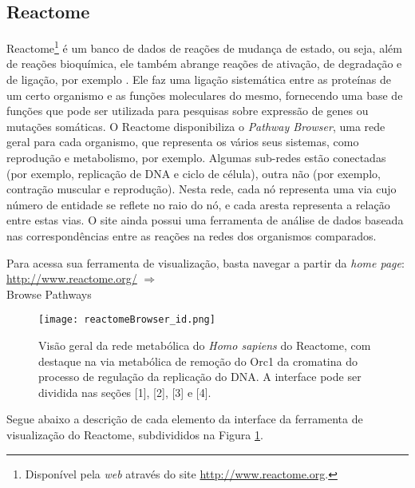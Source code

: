 
\subsection{Reactome}

\indent Reactome\footnote{Disponível pela \textit{web} através do site \url{http://www.reactome.org}.} é um banco de dados de reações de mudança de estado, ou seja, além de reações bioquímica, ele também abrange reações de ativação, de degradação e de ligação, por exemplo \cite{reactomeUsersguide}. Ele faz uma ligação sistemática entre as proteínas de um certo organismo e as funções moleculares do mesmo, fornecendo uma base de funções que pode ser utilizada para pesquisas sobre expressão de genes ou mutações somáticas. O Reactome disponibiliza o \textit{Pathway Browser}, uma rede geral para cada organismo, que representa os vários seus sistemas, como reprodução e metabolismo, por exemplo. Algumas sub-redes estão conectadas (por exemplo, replicação de DNA e ciclo de célula), outra não (por exemplo, contração muscular e reprodução). Nesta rede, cada nó representa uma via cujo número de entidade se reflete no raio do nó, e cada aresta representa a relação entre estas vias. O site ainda possui uma ferramenta de análise de dados baseada nas correspondências entre as reações na redes dos organismos comparados.

\indent Para acessa sua ferramenta de visualização, basta navegar a partir da \textit{home page}: \\

\indent \url{http://www.reactome.org/} $\Rightarrow$ \\
\indent Browse Pathways \\

\begin{figure}[!h]
\centering
\texttt{[image: reactomeBrowser\_id.png]}
\caption{Visão geral da rede metabólica do \textit{Homo sapiens} do Reactome, com destaque na via metabólica de remoção do Orc1 da cromatina do processo de regulação da replicação do DNA. A interface pode ser dividida nas seções [1], [2], [3] e [4].}
\label{reactomeBrowser_id}
\end{figure}

\indent Segue abaixo a descrição de cada elemento da interface da ferramenta de visualização do Reactome, subdivididos na Figura \ref{reactomeBrowser_id}.

